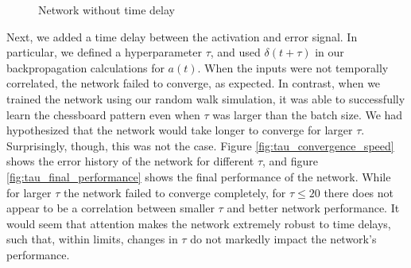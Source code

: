 \documentclass[12pt]{article}
\begin{document}
\begin{figure}%
	\centering
	\qquad
	\caption{Network without time delay}%
	\label{fig:example}%
\end{figure}

Next, we added a time delay between the activation and error signal. In particular, we defined a hyperparameter $\tau$, and used $\delta(t+\tau)$ in our backpropagation calculations for $a(t)$. When the inputs were not temporally correlated, the network failed to converge, as expected. In contrast, when we trained the network using our random walk simulation, it was able to successfully learn the chessboard pattern even when $\tau$ was larger than the batch size. We had hypothesized that the network would take longer to converge for larger $\tau$. Surprisingly, though, this was not the case. Figure \ref{fig:tau_convergence_speed} shows the error history of the network for different $\tau$, and figure \ref{fig:tau_final_performance} shows the final performance of the network. While for larger $\tau$ the network failed to converge completely, for $\tau\leq 20$ there does not appear to be a correlation between smaller $\tau$ and better network performance. It would seem that attention makes the network extremely robust to time delays, such that, within limits, changes in $\tau$ do not markedly impact the network's performance.
\end{document}
